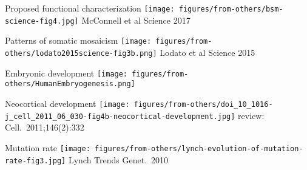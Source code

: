 \documentclass{beamer}
\begin{document}
\begin{frame}{Proposed functional characterization}
\texttt{[image: figures/from-others/bsm-science-fig4.jpg]}
\vfill
\tiny{McConnell et al Science 2017}
\end{frame}

\begin{frame}{Patterns of somatic mosaicism}
\texttt{[image: figures/from-others/lodato2015science-fig3b.png]}
\vfill
\tiny{Lodato et al Science 2015}
\end{frame}

\begin{frame}{Embryonic development}
\texttt{[image: figures/from-others/HumanEmbryogenesis.png]}
\end{frame}

\begin{frame}{Neocortical development}
\texttt{[image: figures/from-others/doi\_10\_1016-j\_cell\_2011\_06\_030-fig4b-neocortical-development.jpg]}
\vfill
\tiny{review: Cell.~2011;146(2):332}
\end{frame}

\begin{frame}{Mutation rate}
\texttt{[image: figures/from-others/lynch-evolution-of-mutation-rate-fig3.jpg]}
\vfill
\tiny{Lynch Trends Genet.~2010}
\end{frame}
\end{document}
